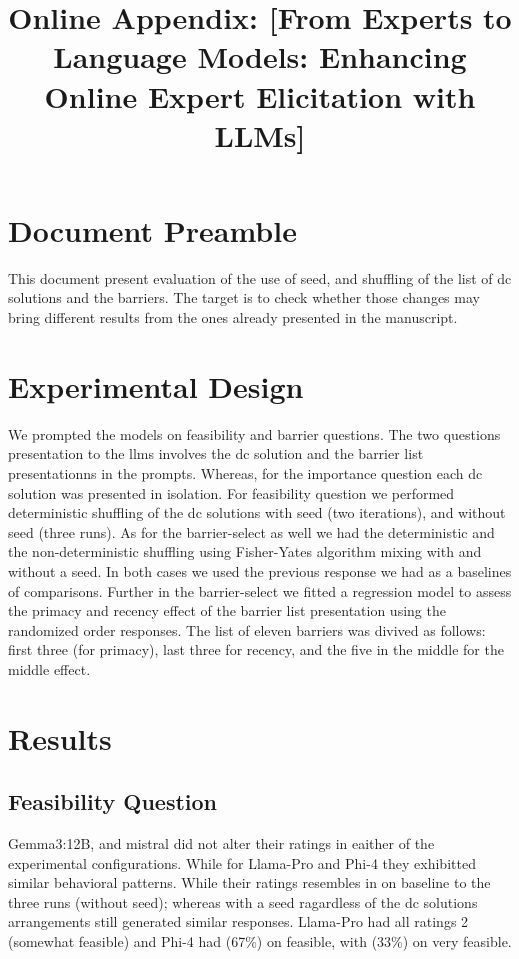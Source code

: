 \documentclass[manuscript,review,anonymous]{acmart}
\begin{document}
\title{Online Appendix: [From Experts to Language Models: Enhancing Online Expert Elicitation with LLMs]}

\maketitle


\section{Document Preamble}
This document present evaluation of the use of seed, and shuffling of the list of \gls{dc} solutions and the barriers. The target is to check whether those changes may bring different results from the ones already presented in the manuscript. 


\section{Experimental Design}
We prompted the models on feasibility and barrier questions. The two questions presentation to the \glspl{llm} involves the \gls{dc} solution and the barrier list presentationns in the prompts. Whereas, for the importance question each \gls{dc} solution was presented in isolation. 
For feasibility question we performed deterministic shuffling of the \gls{dc} solutions with seed (two iterations), and without seed (three runs).
As for the barrier-select as well we had the deterministic and the non-deterministic shuffling using Fisher-Yates algorithm mixing with and without a seed. In both cases  we used the previous response we had as a baselines of comparisons. 
Further in the barrier-select we fitted a regression model to assess the primacy and recency effect of the barrier list presentation using the randomized order responses. 
The list of eleven barriers was divived as follows: first three (for primacy), last three for recency, and the five in the middle for the middle effect.

\section{Results}

\subsection{Feasibility Question}
Gemma3:12B, and mistral did not alter their ratings in eaither of the experimental configurations. 
While for Llama-Pro and Phi-4 they exhibitted similar behavioral patterns. 
While their ratings resembles in on baseline to the three runs (without seed); whereas with a seed ragardless of the \gls{dc} solutions arrangements still generated similar responses. 
Llama-Pro had all ratings 2 (somewhat feasible) and Phi-4 had (67\%) on feasible, with (33\%) on very feasible. 
\end{document}
